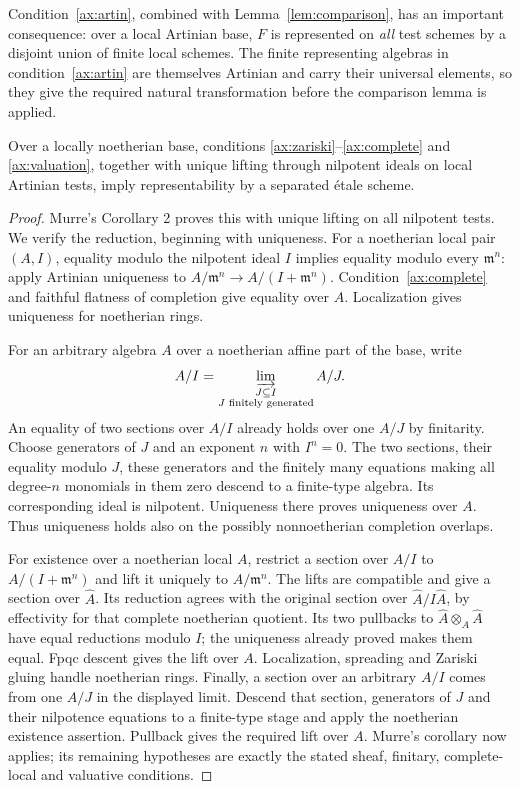 Condition~\ref{ax:artin}, combined with Lemma~\ref{lem:comparison}, has an important consequence: over a local Artinian base, $F$ is represented on \emph{all} test schemes by a disjoint union of finite local schemes. The finite representing algebras in condition~\ref{ax:artin} are themselves Artinian and carry their universal elements, so they give the required natural transformation before the comparison lemma is applied.

\begin{lemma}\label{lem:etale}
Over a locally noetherian base, conditions \ref{ax:zariski}--\ref{ax:complete} and \ref{ax:valuation}, together with unique lifting through nilpotent ideals on local Artinian tests, imply representability by a separated \'etale scheme.
\end{lemma}
\begin{proof}
Murre's Corollary 2 \cite[p.~247]{Murre} proves this with unique lifting on all nilpotent tests. We verify the reduction, beginning with uniqueness. For a noetherian local pair $(A,I)$, equality modulo the nilpotent ideal $I$ implies equality modulo every $\mathfrak m^n$: apply Artinian uniqueness to $A/\mathfrak m^n\to A/(I+\mathfrak m^n)$. Condition~\ref{ax:complete} and faithful flatness of completion give equality over $A$. Localization gives uniqueness for noetherian rings.

For an arbitrary algebra $A$ over a noetherian affine part of the base, write
\[
 A/I=\varinjlim_{\substack{J\subseteq I\\J\text{ finitely generated}}} A/J.
\]
An equality of two sections over $A/I$ already holds over one $A/J$ by finitarity. Choose generators of $J$ and an exponent $n$ with $I^n=0$. The two sections, their equality modulo $J$, these generators and the finitely many equations making all degree-$n$ monomials in them zero descend to a finite-type algebra. Its corresponding ideal is nilpotent. Uniqueness there proves uniqueness over $A$. Thus uniqueness holds also on the possibly nonnoetherian completion overlaps.

For existence over a noetherian local $A$, restrict a section over $A/I$ to $A/(I+\mathfrak m^n)$ and lift it uniquely to $A/\mathfrak m^n$. The lifts are compatible and give a section over $\widehat A$. Its reduction agrees with the original section over $\widehat A/I\widehat A$, by effectivity for that complete noetherian quotient. Its two pullbacks to $\widehat A\otimes_A\widehat A$ have equal reductions modulo $I$; the uniqueness already proved makes them equal. Fpqc descent gives the lift over $A$. Localization, spreading and Zariski gluing handle noetherian rings. Finally, a section over an arbitrary $A/I$ comes from one $A/J$ in the displayed limit. Descend that section, generators of $J$ and their nilpotence equations to a finite-type stage and apply the noetherian existence assertion. Pullback gives the required lift over $A$. Murre's corollary now applies; its remaining hypotheses are exactly the stated sheaf, finitary, complete-local and valuative conditions.
\end{proof}

